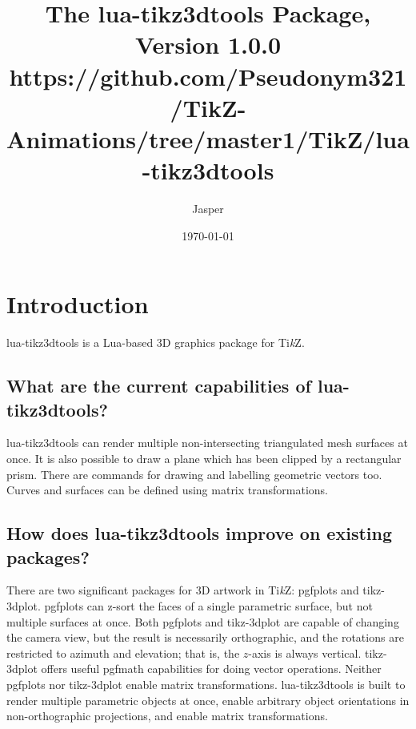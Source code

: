 \documentclass[12pt]{report}
\title{
    The lua-tikz3dtools Package,\\
    Version 1.0.0\\
    {\small https://github.com/Pseudonym321/TikZ-Animations/tree/master1/TikZ/lua-tikz3dtools}
}
\author{Jasper}
\date{\today}
\begin{document}
    \maketitle 
    \tableofcontents
    \chapter{Introduction}
        lua-tikz3dtools is a Lua-based 3D graphics package for 
        Ti\textit{k}Z.
        \section{What are the current capabilities of lua-tikz3dtools?}
            lua-tikz3dtools can render multiple non-intersecting 
            triangulated mesh surfaces at once. It is also possible 
            to draw a plane which has been clipped by a rectangular
            prism.
            There are commands for drawing and labelling geometric 
            vectors too. Curves and surfaces can be defined using 
            matrix transformations.
        \section{
            How does lua-tikz3dtools improve on existing packages?
        }
            There are two significant packages for 3D artwork in 
            Ti\textit{k}Z: pgfplots and tikz-3dplot.
            pgfplots can z-sort the faces of a single parametric 
            surface, but not multiple surfaces at once.
            Both pgfplots and tikz-3dplot are capable of changing 
            the camera view, but the result is necessarily 
            orthographic, and the rotations are restricted to 
            azimuth and elevation; that is, the \(z\)-axis is always 
            vertical. tikz-3dplot offers useful pgfmath capabilities 
            for doing vector operations.
            Neither pgfplots nor tikz-3dplot enable 
            matrix transformations. lua-tikz3dtools is built to render 
            multiple parametric objects at once, enable arbitrary
            object orientations in non-orthographic projections, 
            and enable matrix transformations.
\end{document}

